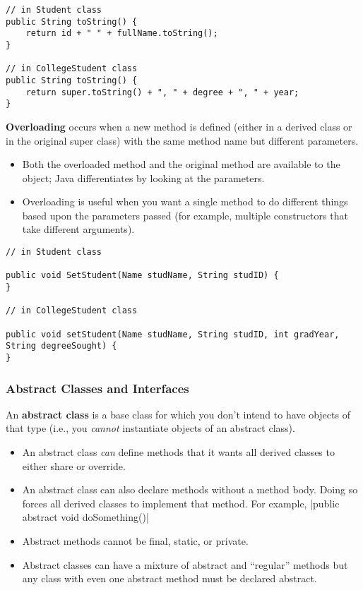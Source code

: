 \documentclass{article}
\begin{document}
\begin{flushleft}
\begin{verbatim}
// in Student class
public String toString() {
    return id + " " + fullName.toString();
}

// in CollegeStudent class
public String toString() {
    return super.toString() + ", " + degree + ", " + year;
}
\end{verbatim}

\textbf{Overloading} occurs when a new method is defined (either in a derived class or in the original super class) with the same method name but different parameters. 

\begin{itemize}
    \item Both the overloaded method and the original method are available to the object; Java differentiates by looking at the parameters.
    \item Overloading is useful when you want a single method to do different things based upon the parameters passed (for example, multiple constructors that take different arguments).
\end{itemize}

\begin{verbatim}
// in Student class

public void SetStudent(Name studName, String studID) {
}

// in CollegeStudent class

public void setStudent(Name studName, String studID, int gradYear, String degreeSought) {
}
\end{verbatim}

\subsubsection{Abstract Classes and Interfaces}

An \textbf{abstract class} is a base class for which you don't intend to have objects of that type (i.e., you \textit{cannot} instantiate objects of an abstract class). 
\begin{itemize}
    \item An abstract class \textit{can} define methods that it wants all derived classes to either share or override.
    \item An abstract class can also declare methods without a method body. Doing so forces all derived classes to implement that method. For example, |public abstract void doSomething()|
    \item Abstract methods cannot be final, static, or private.
    \item Abstract classes can have a mixture of abstract and ``regular'' methods but any class with even one abstract method must be declared abstract.
\end{itemize}


\end{flushleft}
\end{document}
